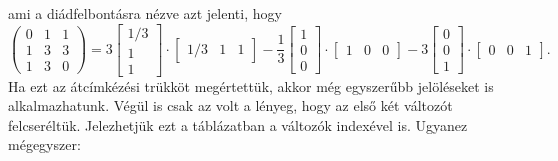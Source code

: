 \documentclass[a4paper, showtrims]{memoir}
\theoremstyle{plain}
\theoremstyle{remark}
\theoremstyle{definition}
\begin{document}
ami a diádfelbontásra nézve azt jelenti, hogy
\[
    \begin{pmatrix}
        0&1&1\\
        1&3&3\\
        1&3&0
    \end{pmatrix}
    =
    3
    \begin{bmatrix}
        1/3\\1\\1
    \end{bmatrix}
    \cdot
    \begin{bmatrix}
        1/3&1&1
    \end{bmatrix}
    -\frac{1}{3}
    \begin{bmatrix}
        1\\0\\0
    \end{bmatrix}
    \cdot
    \begin{bmatrix}
        1&0&0
    \end{bmatrix}
    -3
    \begin{bmatrix}
        0\\0\\1
    \end{bmatrix}
    \cdot
    \begin{bmatrix}
        0&0&1
    \end{bmatrix}.
\]
Ha ezt az átcímkézési trükköt megértettük, akkor még egyszerűbb jelöléseket is alkalmazhatunk.
Végül is csak az volt a lényeg, hogy az első két változót felcseréltük. 
Jelezhetjük ezt a táblázatban a változók indexével is. 
Ugyanez mégegyszer:
\end{document}
